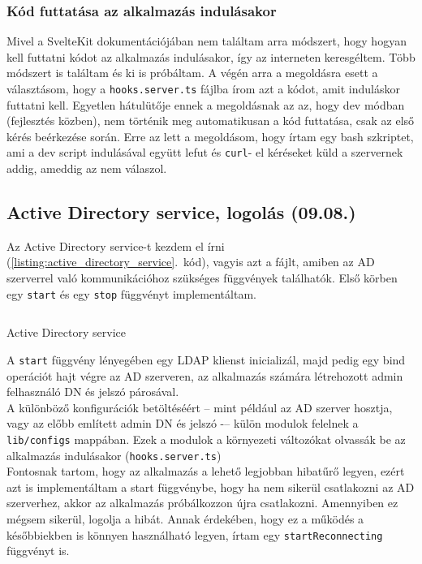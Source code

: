 \documentclass[a4paper]{article}
\newcommand{\inlts}[1]{\texttt{#1}}
\newcommand{\inltxt}[1]{\texttt{#1}}
\begin{document}
\subsubsection*{Kód futtatása az alkalmazás indulásakor}
Mivel a SvelteKit dokumentációjában nem találtam arra módszert, hogy hogyan kell futtatni kódot az
alkalmazás indulásakor, így az interneten keresgéltem. Több módszert is találtam és ki is próbáltam. A
végén arra a megoldásra esett a választásom, hogy a \inlts{hooks.server.ts} fájlba írom azt a kódot, amit
induláskor futtatni kell. Egyetlen hátulütője ennek a megoldásnak az az, hogy dev módban (fejlesztés
közben), nem történik meg automatikusan a kód futtatása, csak az első kérés beérkezése során. Erre
az lett a megoldásom, hogy írtam egy bash szkriptet, ami a dev script indulásával együtt lefut és \inltxt{curl}-
el kéréseket küld a szervernek addig, ameddig az nem válaszol.

\subsection{Active Directory service, logolás (09.08.)}

Az Active Directory service-t kezdem el írni (\ref{listing:active_directory_service}.~kód), vagyis azt a fájlt, amiben az AD szerverrel való
kommunikációhoz szükséges függvények találhatók. Első körben egy \inlts{start} és egy \inlts{stop} függvényt
implementáltam.

\begin{listing}[!ht]
\inputminted[bgcolor=codebg, breaklines, breakanywhere, fontsize=\small]{typescript}{code/activeDirectoryService.ts}
\caption{Active Directory service}
\label{listing:active_directory_service}
\end{listing}

A \inlts{start} függvény lényegében egy LDAP klienst inicializál, majd pedig egy bind operációt hajt végre az
AD szerveren, az alkalmazás számára létrehozott admin felhasználó DN és jelszó párosával.\\

A különböző konfigurációk betöltéséért -- mint például az AD szerver hosztja, vagy az előbb említett
admin DN és jelszó -– külön modulok felelnek a \inlts{lib/configs} mappában. Ezek a modulok a környezeti
változókat olvassák be az alkalmazás indulásakor (\inlts{hooks.server.ts}) \\

Fontosnak tartom, hogy az alkalmazás a lehető legjobban hibatűrő legyen, ezért azt is implementáltam
a start függvénybe, hogy ha nem sikerül csatlakozni az AD szerverhez, akkor az alkalmazás
próbálkozzon újra csatlakozni. Amennyiben ez mégsem sikerül, logolja a hibát. Annak érdekében, hogy
ez a működés a későbbiekben is könnyen használható legyen, írtam egy \inlts{startReconnecting}
függvényt is.
\end{document}
